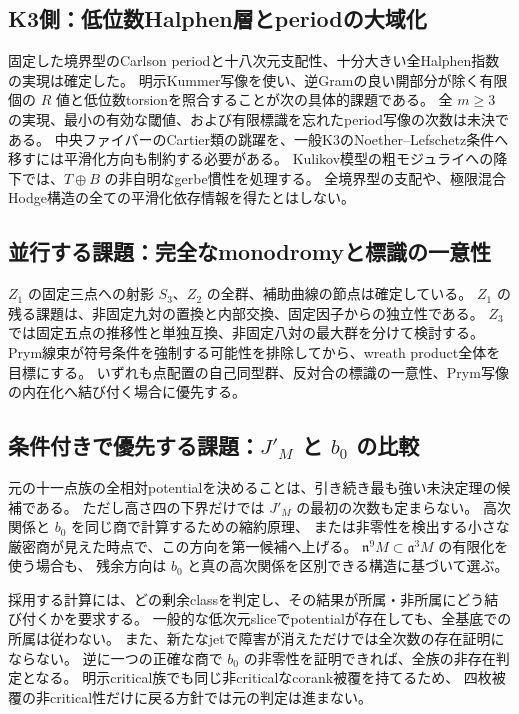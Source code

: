 \subsection{K3側：低位数Halphen層とperiodの大域化}
固定した境界型のCarlson periodと十八次元支配性、十分大きい全Halphen指数の実現は確定した。
明示Kummer写像を使い、逆Gramの良い開部分が除く有限個の $R$ 値と低位数torsionを照合することが次の具体的課題である。
全 $m\ge3$ の実現、最小の有効な閾値、および有限標識を忘れたperiod写像の次数は未決である。
中央ファイバーのCartier類の跳躍を、一般K3のNoether--Lefschetz条件へ移すには平滑化方向も制約する必要がある。
Kulikov模型の粗モジュライへの降下では、$T\oplus B$ の非自明なgerbe慣性を処理する。
全境界型の支配や、極限混合Hodge構造の全ての平滑化依存情報を得たとはしない。

\subsection{並行する課題：完全なmonodromyと標識の一意性}
$Z_1$ の固定三点への射影 $S_3$、$Z_2$ の全群、補助曲線の節点は確定している。
$Z_1$ の残る課題は、非固定九対の置換と内部交換、固定因子からの独立性である。
$Z_3$ では固定五点の推移性と単独互換、非固定八対の最大群を分けて検討する。
Prym線束が符号条件を強制する可能性を排除してから、wreath product全体を目標にする。
いずれも点配置の自己同型群、反対合の標識の一意性、Prym写像の内在化へ結び付く場合に優先する。

\subsection{条件付きで優先する課題：$J'_M$ と $b_0$ の比較}
元の十一点族の全相対potentialを決めることは、引き続き最も強い未決定理の候補である。
ただし高さ四の下界だけでは $J'_M$ の最初の次数も定まらない。
高次関係と $b_0$ を同じ商で計算するための縮約原理、
または非零性を検出する小さな厳密商が見えた時点で、この方向を第一候補へ上げる。
$\mathfrak n^9M\subset\mathfrak a^3M$ の有限化を使う場合も、
残余方向は $b_0$ と真の高次関係を区別できる構造に基づいて選ぶ。

採用する計算には、どの剰余classを判定し、その結果が所属・非所属にどう結び付くかを要求する。
一般的な低次元sliceでpotentialが存在しても、全基底での所属は従わない。
また、新たなjetで障害が消えただけでは全次数の存在証明にならない。
逆に一つの正確な商で $b_0$ の非零性を証明できれば、全族の非存在判定となる。
明示critical族でも同じ非criticalなcorank被覆を持てるため、
四枚被覆の非critical性だけに戻る方針では元の判定は進まない。

